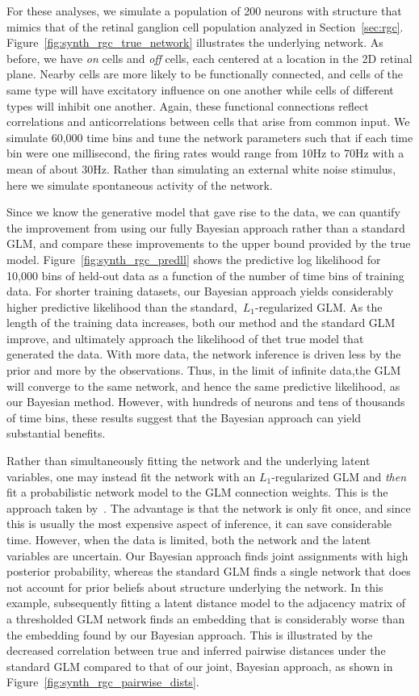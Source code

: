 For these analyses, we simulate a population of 200 neurons with
structure that mimics that of the retinal ganglion cell population
analyzed in Section~\ref{sec:rgc}. Figure~\ref{fig:synth_rgc_true_network}
illustrates the underlying network. As before, we have \textit{on}
cells and \textit{off} cells, each centered at a location in the 2D
retinal plane. Nearby cells are more likely to be functionally
connected, and cells of the same type will have excitatory influence
on one another while cells of different types will inhibit one
another. Again, these functional connections reflect correlations and
anticorrelations between cells that arise from common input. We
simulate 60,000 time bins and tune the network parameters such that if
each time bin were one millisecond, the firing rates would range from 10Hz to
70Hz with a mean of about 30Hz.  Rather than simulating an
external white noise stimulus, here we simulate spontaneous activity
of the network.

Since we know the generative model that gave rise to the data, we can
quantify the improvement from using our fully Bayesian approach
rather than a standard GLM, and compare these improvements to the
upper bound provided by the true model. Figure~\ref{fig:synth_rgc_predll}
shows the predictive log likelihood for 10,000 bins of held-out data as
a function of the number of time bins of training data. For shorter
training datasets, our Bayesian approach yields considerably higher
predictive likelihood than the standard,~$L_1$-regularized GLM. As
the length of the training data increases, both our method and
the standard GLM improve, and ultimately approach the likelihood of
thet true model that generated the data. With more data, the network
inference is driven less by the prior and more by the observations.
Thus, in the limit of infinite data,the GLM will converge to the same
network, and hence the same predictive likelihood, as our Bayesian method.
However, with hundreds of neurons and tens of thousands of time bins,
these results suggest that the Bayesian approach can yield substantial
benefits.

Rather than simultaneously fitting the network and the underlying
latent variables, one may instead fit the network with an
$L_1$-regularized GLM and \textit{then} fit a probabilistic network
model to the GLM connection weights. This is the approach taken
by~\citet{stevenson2009bayesian}.  The advantage is that the network
is only fit once, and since this is usually the most expensive aspect
of inference, it can save considerable time. However, when the data is
limited, both the network and the latent variables are uncertain.  Our
Bayesian approach finds joint assignments with high posterior
probability, whereas the standard GLM finds a single network that does
not account for prior beliefs about structure underlying the network.
In this example, subsequently fitting a latent distance model to the
adjacency matrix of a thresholded GLM network finds an embedding that
is considerably worse than the embedding found by our Bayesian
approach. This is illustrated by the decreased correlation between
true and inferred pairwise distances under the standard GLM compared
to that of our joint, Bayesian approach, as shown in
Figure~\ref{fig:synth_rgc_pairwise_dists}.

